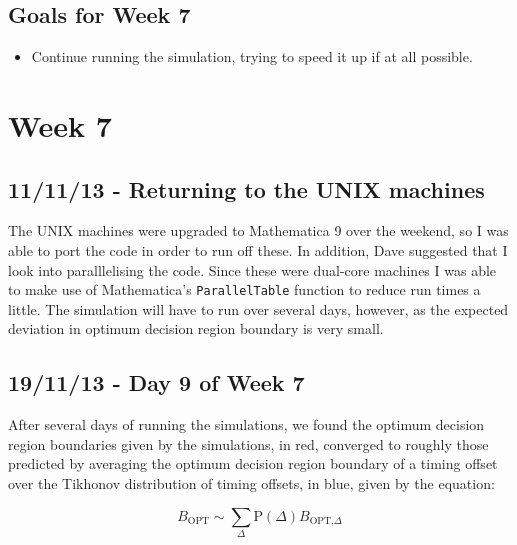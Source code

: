 \subsection{Goals for Week 7}

\begin{itemize}
\itemsep1pt\parskip0pt
\item
  Continue running the simulation, trying to speed it up if at all
  possible.
\end{itemize}

\section{Week 7}

\subsection{11/11/13 - Returning to the UNIX machines}

The UNIX machines were upgraded to Mathematica 9 over the weekend, so I
was able to port the code in order to run off these. In addition, Dave
suggested that I look into paralllelising the code. Since these were
dual-core machines I was able to make use of Mathematica's
\texttt{ParallelTable} function to reduce run times a little. The
simulation will have to run over several days, however, as the expected
deviation in optimum decision region boundary is very small.

\subsection{19/11/13 - Day 9 of Week 7}

After several days of running the simulations, we found the optimum
decision region boundaries given by the simulations, in red, converged
to roughly those predicted by averaging the optimum decision region
boundary of a timing offset over the Tikhonov distribution of timing
offsets, in blue, given by the equation:

\[
B_{\text{OPT}} \sim \sum_{\Delta} \text{P}(\Delta) B_{\text{OPT,}\Delta}
\]

